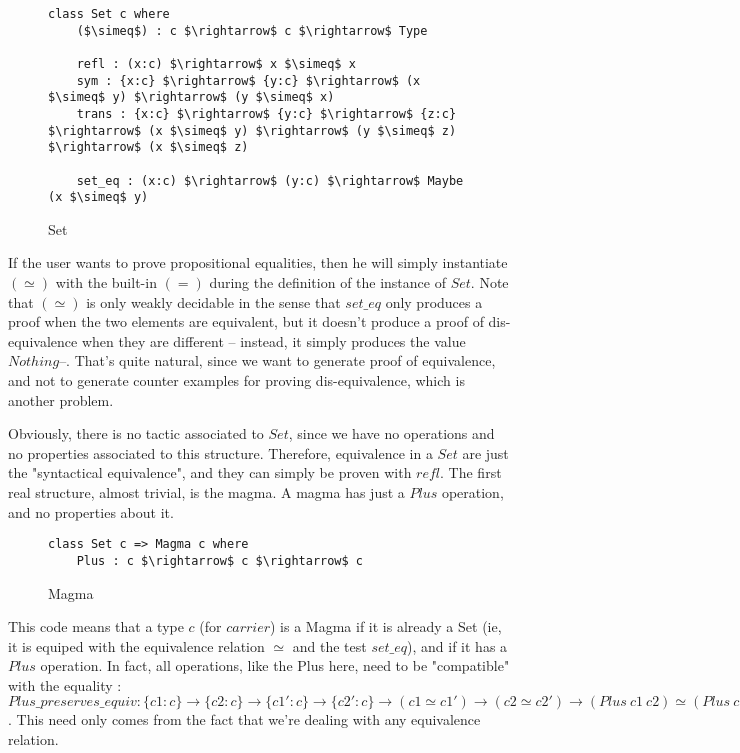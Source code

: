 \begin{figure}[H]
\figrule
\begin{center}
\begin{lstlisting}
class Set c where
    ($\simeq$) : c $\rightarrow$ c $\rightarrow$ Type

    refl : (x:c) $\rightarrow$ x $\simeq$ x
    sym : {x:c} $\rightarrow$ {y:c} $\rightarrow$ (x $\simeq$ y) $\rightarrow$ (y $\simeq$ x)
    trans : {x:c} $\rightarrow$ {y:c} $\rightarrow$ {z:c} $\rightarrow$ (x $\simeq$ y) $\rightarrow$ (y $\simeq$ z) $\rightarrow$ (x $\simeq$ z)    
    
    set_eq : (x:c) $\rightarrow$ (y:c) $\rightarrow$ Maybe (x $\simeq$ y)
\end{lstlisting}
\end{center}
\caption{Set}
\label{Set}
\figrule
\end{figure}
If the user wants to prove propositional equalities, then he will simply instantiate $(\simeq)$ with the built-in $(=)$ during the definition of the instance of $Set$.
Note that $(\simeq)$ is only weakly decidable in the sense that $set\_eq$ only produces a proof when the two elements are equivalent, but it doesn't produce a proof of dis-equivalence when they are different -- instead, it simply produces the value $Nothing$--. That's quite natural, since we want to generate proof of equivalence, and not to generate counter examples for proving dis-equivalence, which is another problem.

Obviously, there is no tactic associated to $Set$, since we have no operations and no properties associated to this structure. Therefore, equivalence in a $Set$ are just the "syntactical equivalence", and they can simply be proven with $refl$.
The first real structure, almost trivial, is the magma. A magma has just a $Plus$ operation, and no properties about it.

\begin{figure}[H]
\figrule
\begin{center}
\begin{lstlisting}
class Set c => Magma c where
    Plus : c $\rightarrow$ c $\rightarrow$ c
\end{lstlisting}
\end{center}
\caption{Magma}
\label{Magma}
\figrule
\end{figure}

This code means that a type $c$ (for $carrier$) is a Magma if it is already a Set (ie, it is equiped with the equivalence relation $\simeq$ and the test $set\_eq$), and if it has a $Plus$ operation.
In fact, all operations, like the Plus here, need to be "compatible" with the equality : $Plus\_preserves\_equiv : \{c1:c\} \rightarrow \{c2:c\} \rightarrow \{c1':c\} \rightarrow \{c2':c\} \rightarrow (c1 \simeq c1') \rightarrow (c2 \simeq c2') \rightarrow (Plus\ c1\ c2) \simeq (Plus\ c1'\ c2')$. This need only comes from the fact that we're dealing with any equivalence relation.

